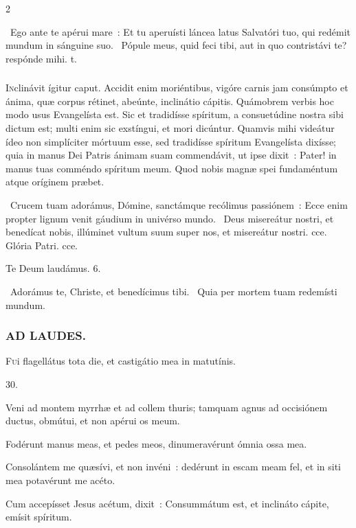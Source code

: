 \documentclass[9pt,twoside]{extarticle}
\begin{document}
\begin{multicols}{2}
{\begin{tightlist}{}
\item {}~Ego ante te apérui mare~: \textred{*} Et tu aperuísti láncea latus Salvatóri tuo, qui redémit mundum in sánguine suo. ~Pópule meus, quid feci tibi, aut in quo contristávi te? respónde mihi. t.
\end{tightlist}

\subsubsection*{\center{}}
\lettrine{I}nclinávit ígitur caput. Accidit enim moriéntibus, vigóre carnis jam consúmpto et ánima, quæ corpus rétinet, abeúnte, inclinátio cápitis. Quámobrem verbis hoc modo usus Evangelísta est. Sic et tradidísse spíritum, a consuetúdine nostra sibi dictum est; multi enim sic exstíngui, et mori dicúntur. Quamvis mihi videátur ídeo non simplíciter mórtuum esse, sed tradidísse spíritum Evangelísta dixísse; quia in manus Dei Patris ánimam suam commendávit, ut ipse dixit~: Pater! in manus tuas comméndo spíritum meum. Quod nobis magnæ spei fundaméntum atque oríginem præbet.

\begin{tightlist}{}
\item {}~Crucem tuam adorámus, Dómine, sanctámque recólimus passiónem~: \textred{*} Ecce enim propter lignum venit gáudium in univérso mundo. ~Deus misereátur nostri, et benedícat nobis, illúminet vultum suum super nos, et misereátur nostri. cce. Glória Patri. cce.
\item Te Deum laudámus. 6.
\item {}~Adorámus te, Christe, et benedícimus tibi. ~Quia per mortem tuam redemísti mundum.
\end{tightlist}

\subsubsection*{\center \textsc{AD LAUDES.}}
\begin{center}\end{center}
\lettrine{F}ui flagellátus tota die, et castigátio mea in matutínis.

\begin{tightlist}{}
\item {} 30. 
\item {} Veni ad montem myrrhæ et ad collem thuris; tamquam agnus ad occisiónem ductus, obmútui, et non apérui os meum.
\item {} Fodérunt manus meas, et pedes meos, dinumeravérunt ómnia ossa mea.
\item {} Consolántem me quæsívi, et non invéni~: dedérunt in escam meam fel, et in siti mea potavérunt me acéto.
\item {} Cum accepísset Jesus acétum, dixit~: Consummátum est, et inclináto cápite, emísit spíritum.
\end{tightlist}

}
\end{multicols}
\end{document}
